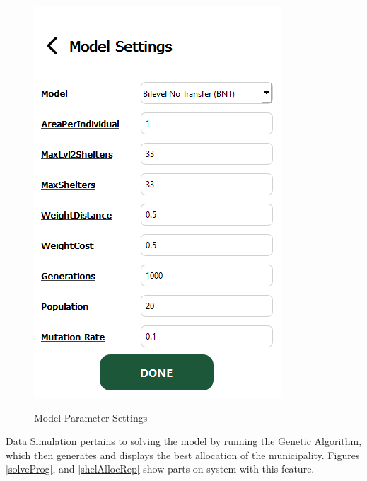 \documentclass[11pt,letterpaper,]{article}
\begin{document}
	\begin{figure}[h!]
		\caption{Model Parameter Settings}
		\centering
		\includegraphics[width=0.3\columnwidth]{Chapter 4/modelsettings}
		\label{modelSet}
	\end{figure}
	
	Data Simulation pertains to solving the model by running the Genetic Algorithm, which then generates and displays the best allocation of the municipality. Figures \ref{solveProg}, and \ref{shelAllocRep} show parts on system with this feature.
	
\end{document}
